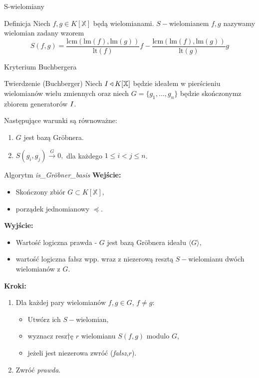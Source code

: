\documentclass{beamer}
\newcommand{\II}{\mathnormal{I}}
\newcommand{\lt}{\textrm{lt}}
\newcommand{\lm}{\textrm{lm}}
\begin{document}
\begin{frame}{S-wielomiany}
    \begin{block}{Definicja}
        Niech $f,g \in K[\mathbb{X}]$ będą wielomianami. $S-$wielomianem $f,g$ nazywamy wielomian zadany wzorem 
        $$ S(f,g) = \frac{\textrm{lcm} (\lm(f),\lm(g))}{\lt(f)}f -\frac{\textrm {lcm}(\lm(f),\lm(g))}{\lt(g)}g $$
    \end{block}
\end{frame}

\begin{frame}{Kryterium Buchbergera}
    \begin{block}{Twierdzenie (Buchberger)}
        Niech $\II \triangleleft K[\mathbb{X}]$ będzie ideałem w pierścieniu wielomianów wielu zmiennych oraz niech $G = \{g_1 , \ldots , g_n\}$ będzie skończonymz zbiorem generatorów $\II$. 

        Następujące warunki są równoważne:
        \begin{enumerate}
            \item $G$ jest bazą Gr\"obnera. 
            \item $S(g_i,g_j) \xrightarrow{G} 0,$ dla każdego $1 \leq i < j \leq n$. 
        \end{enumerate}
    \end{block}
\end{frame}

\begin{frame}{Algorytm \textit{is\_Gr\"obner\_basis}}
    \textbf{Wejście:} 
    \begin{itemize} 
        \item Skończony zbiór $G \subset K[\mathbb{X}],$ \item porządek jednomianowy $\preceq$. 
    \end{itemize}

    \textbf{Wyjście:} 
    \begin{itemize}
        \item Wartość logiczna prawda - $G$ jest bazą Gr\"obnera ideału $\langle G \rangle,$ 
        \item wartość logiczna fałsz wpp. wraz z niezerową resztą $S-$wielomianu dwóch wielomianów z $G$.
    \end{itemize}

    \textbf{Kroki:}
    \begin{enumerate}
        \item Dla każdej pary wielomianów $f,g \in G$, $f \neq g$:
        \begin{itemize}
            \item Utwórz ich $S-$wielomian, 
            \item wyznacz resz†ę $r$ wielomianu  $S(f,g)$ modulo $G$, 
            \item jeżeli jest niezerowa zwróć (\textit{fałsz},$r$).
        \end{itemize}
        \item Zwróć \textit{prawda}.
    \end{enumerate}
\end{frame}
\end{document}
